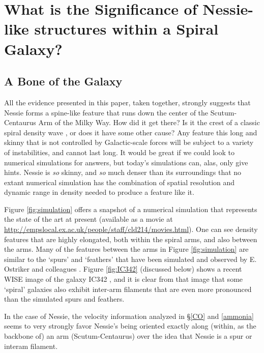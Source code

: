 \section{What is the Significance of Nessie-like structures within a Spiral Galaxy?}
\subsection{A Bone of the Galaxy}
\label{spine}
All the evidence presented in this paper, taken together, strongly suggests that Nessie forms a spine-like feature that runs down the center of the Scutum-Centaurus Arm of the Milky Way.  How did it get there?  Is it the crest of a classic spiral density wave \citep{Lin1964}, or does it have some other cause?  Any feature this long and skinny that is not controlled by Galactic-scale forces will be subject to a variety of instabilities, and cannot last long. It would be great if we could look to numerical simulations for answers, but today's simulations can, alas, only give hints.  Nessie is {\it so} skinny, and {\it so} much denser than its surroundings that no extant numerical simulation has the combination of spatial resolution and dynamic range in density needed to produce a feature like it.

Figure \ref{fig:simulation} offers a snapshot of a numerical simulation \cite{2013MNRAS.432..653D} that represents the state of the art at present (available as a movie at \url{http://empslocal.ex.ac.uk/people/staff/cld214/movies.html}).  One can see density features that are highly elongated, both within the spiral arms, and also between the arms.  Many of the features between the arms in Figure \ref{fig:simulation} are similar to the `spurs' and `feathers' that have been simulated and observed by E. Ostriker and colleagues \citep{Shetty2006,Vigne2008,Corder2008}.   Figure \ref{fig:IC342} (discussed below) shows a recent WISE image of the galaxy IC342 \citep{Jarrett2013}, and it is clear from that image that some `spiral' galaxies also exhibit inter-arm filaments that are even more pronounced than the simulated spurs and feathers.  

In the case of Nessie, the velocity information analyzed in \S \ref{CO} and \ref{ammonia} seems to very strongly favor Nessie's being oriented exactly along (within, as the backbone of) an arm (Scutum-Centaurus) over the idea that Nessie is a spur or interam filament.


